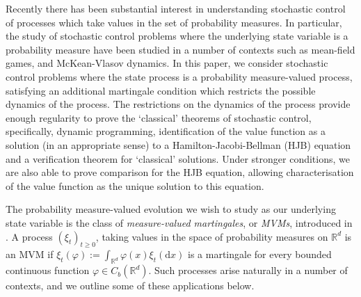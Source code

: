 \documentclass{article}
\theoremstyle{definition}
\numberwithin{equation}{section}
\numberwithin{theorem}{section}
\newcommand{\R}{\mathbb{R}}
\newcommand{\dx}{\mathrm{d}x}
\begin{document}
Recently there has been substantial interest in understanding
stochastic control of processes which take values in the set of probability
measures. In particular, the study of stochastic control problems
where the underlying state variable is a probability measure have been
studied in a number of contexts such as mean-field games, and
McKean-Vlasov dynamics. In this paper, we consider
stochastic control problems where the state process is a
probability measure-valued process, satisfying an additional
martingale condition which restricts the possible dynamics of the
process. The restrictions on the dynamics of the process provide
enough regularity to prove the `classical' theorems of stochastic
control, specifically, dynamic programming, identification of the
value function as a solution (in an appropriate sense) to a
Hamilton-Jacobi-Bellman (HJB) equation and a verification theorem for
`classical' solutions. Under stronger conditions, we are also able to
prove comparison for the HJB equation, allowing characterisation of
the value function as the unique solution to this equation.

The probability measure-valued evolution we wish to study as our underlying state
variable is the class of \emph{measure-valued martingales}, or
\emph{MVMs}, introduced in \cite{cox2017}. A process $(\xi_t)_{t \ge
  0}$, taking values in the space of probability measures on $\R^d$ is an MVM if $\xi_t(\varphi) := \int_{\R^d} \varphi(x)\xi_t(\dx)$ is a
martingale for every bounded continuous function $\varphi \in C_b(\R^d)$. Such processes arise naturally
in a number of contexts, and we outline some of these applications
below.
\end{document}
